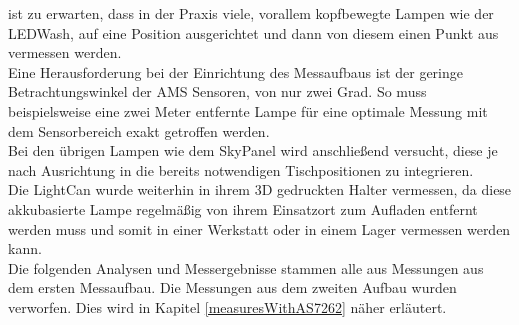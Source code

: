 \documentclass[11pt]{scrartcl}
\begin{document}
ist zu erwarten, dass in der Praxis viele, vorallem kopfbewegte Lampen wie der LEDWash, auf eine Position ausgerichtet und dann von diesem
einen Punkt aus vermessen werden.\\
Eine Herausforderung bei der Einrichtung des Messaufbaus ist der geringe Betrachtungswinkel der AMS Sensoren, von nur zwei Grad. So muss beispielsweise eine
zwei Meter entfernte Lampe für eine optimale Messung mit dem Sensorbereich exakt getroffen werden.\\
Bei den übrigen Lampen wie dem SkyPanel wird anschließend versucht, diese je nach Ausrichtung in die bereits notwendigen Tischpositionen zu integrieren.\\
Die LightCan wurde weiterhin in ihrem 3D gedruckten Halter vermessen, da diese akkubasierte Lampe regelmäßig von ihrem Einsatzort zum Aufladen
entfernt werden muss und somit in einer Werkstatt oder in einem Lager vermessen werden kann.\\
Die folgenden Analysen und Messergebnisse stammen alle aus Messungen aus dem ersten Messaufbau. Die Messungen aus dem zweiten Aufbau wurden
verworfen. Dies wird in Kapitel \ref{measuresWithAS7262} näher erläutert.
\end{document}
